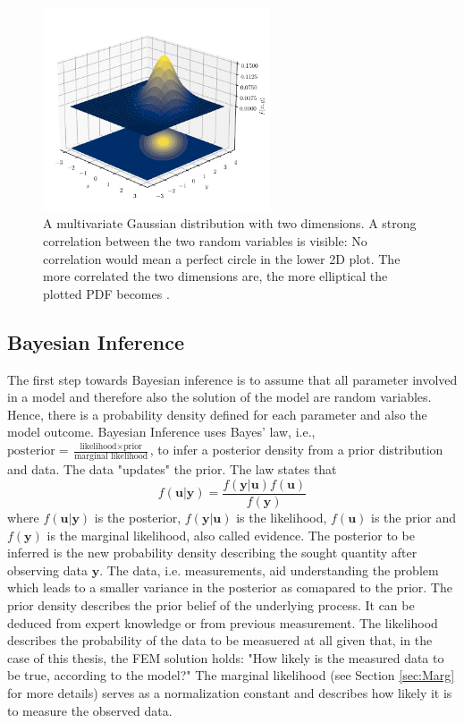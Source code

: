 \documentclass[%
  a4paper,oneside,%
  11pt,%
  smallchapters,
  style=printdev,
  extramargin,
  green,%
  rgb, <cmyk>
  ]{tubsbook}
\begin{document}
\begin{figure}[!ht]
\begin{center}
\includegraphics[width=0.6\textwidth]{pics/Gaussians}
\caption[A bivariate Gaussian distribution]{A multivariate Gaussian distribution with two dimensions. A strong correlation between the two random variables is visible: No correlation would mean a perfect circle in the lower 2D plot. The more correlated the two dimensions are, the more elliptical the plotted PDF becomes \cite{Virtanen2020}.  }
\label{fig:MultiGauss}
\end{center}
\end{figure}

\subsection{Bayesian Inference}
\label{sec:BayesInf}
The first step towards Bayesian inference is to assume that all parameter involved in a model and therefore also the solution of the model are random variables. Hence, there is a probability density defined for each parameter and also the model outcome.
Bayesian Inference uses Bayes' law, i.e., $\text{posterior} = \frac{\text{likelihood} \times \text{prior}}{\text{marginal likelihood}}$, to infer a posterior density from a prior distribution and data. The data "updates" the prior. The law states that
\begin{equation}
f(\bm{u}|\bm{y}) = \frac{f(\bm{y}|\bm{u})f(\bm{u})}{f(\bm{y})}
\label{eqn:BayesRule}
\end{equation}
where $f(\bm{u}|\bm{y})$ is the posterior, $f(\bm{y}|\bm{u})$ is the likelihood, $f(\bm{u})$ is the prior and $f(\bm{y})$ is the marginal likelihood, also called evidence. The posterior to be inferred is the new probability density describing the sought quantity after observing data $\bm{y}$. The data, i.e. measurements, aid understanding the problem which leads to a smaller variance in the posterior as comapared to the prior. The prior density describes the prior belief of the underlying process. It can be deduced from expert knowledge or from previous measurement. 
The likelihood describes the probability of the data to be measuered at all given that, in the case of this thesis, the FEM solution holds: "How likely is the measured data to be true, according to the model?"
The marginal likelihood (see Section \ref{sec:Marg} for more details) serves as a normalization constant and describes how likely it is to measure the observed data.
\end{document}
